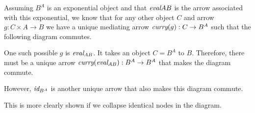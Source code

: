 \documentclass{article}
\newcommand{\curry}[1]{\emph{curry}(#1)}
\newcommand{\eval}{\emph{eval}}
\newcommand{\id}{\emph{id}}
\begin{document}
\begin{enumerate}
  Assuming $B^A$ is an exponential object and that $\eval{AB}$ is the arrow associated with this exponential, we know that for any other object $C$ and arrow $g : C \times A \rightarrow B$ we have a unique mediating arrow $\curry{g} : C \rightarrow B^A$ such that the following diagram commutes.
  \begin{center}
  \end{center}

  One such possible $g$ is $\eval_{AB}$.
  It takes an object $C = B^A$ to $B$.
  Therefore, there must be a unique arrow $\curry{\eval_{AB}} : B^A \rightarrow B^A$ that makes the diagram commute.
  \begin{center}
  \end{center}
  
  However, $\id_{B^A}$ is another unique arrow that also makes this diagram commute.
      
  This is more clearly shown if we collapse identical nodes in the diagram.
  \begin{center}
\end{center}
\end{enumerate}
\end{document}
